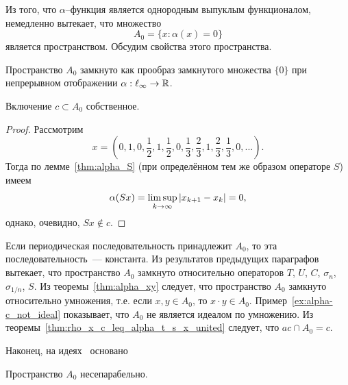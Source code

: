 \label{sec:space_A0}

Из того, что $\alpha$--функция является однородным выпуклым функционалом, немедленно вытекает,
что множество
\begin{equation}
	A_0 = \{x: \alpha(x) = 0\}
\end{equation}
является пространством.
Обсудим свойства этого пространства.

	Пространство $A_0$ замкнуто
	как
	прообраз замкнутого множества $\{0\}$
	при непрерывном отображении $\alpha : \ell_\infty \to \R$.

\begin{property}
	Включение $c \subset A_0$ собственное.
\end{property}
\begin{proof}
	Рассмотрим
	\begin{equation}
		x=\left(
			0,1,
			0,\frac{1}{2},1,\frac{1}{2},
			0,\frac{1}{3},\frac{2}{3},1,\frac{2}{3},\frac{1}{3},
			0,
			...
		\right)
		.
	\end{equation}
	Тогда по лемме~\ref{thm:alpha_S} (при определённом тем же образом операторе $S$) имеем
	\begin{equation}
		\alpha(Sx) = \varlimsup_{k\to\infty} |x_{k+1} - x_{k}| = 0
		,
	\end{equation}
	однако, очевидно, $Sx\notin c$.
\end{proof}

	Если периодическая последовательность принадлежит $A_0$,
	то эта последовательность~--- константа.
Из результатов предыдущих параграфов вытекает, что 
	пространство $A_0$ замкнуто относительно операторов $T$, $U$, $C$, $\sigma_n$, $\sigma_{1/n}$, $S$.
Из теоремы~\ref{thm:alpha_xy} следует, что
	пространство $A_0$ замкнуто относительно умножения,
	т.е. если $x,y\in A_0$, то $x\cdot y \in A_0$.
Пример~\ref{ex:alpha-c_not_ideal} показывает, что $A_0$
не является идеалом по умножению.
Из теоремы~\ref{thm:rho_x_c_leq_alpha_t_s_x_united} следует, что
$ac \cap A_0 = c$.

Наконец,
на идеях~\cite{usachev2009_phd_vsu} основано

\begin{property}
	Пространство $A_0$ несепарабельно.
\end{property}

